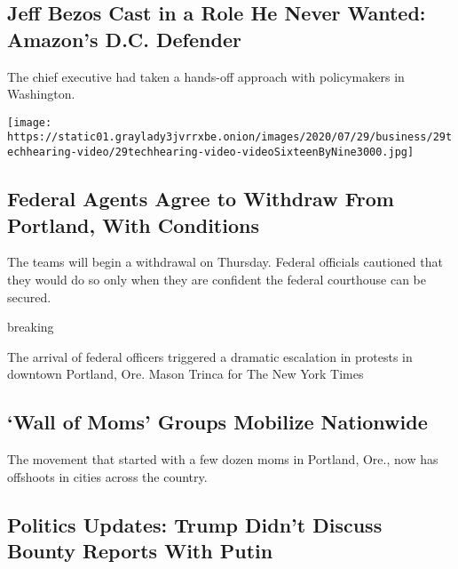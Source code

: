 \hypertarget{jeff-bezos-cast-in-a-role-he-never-wanted-amazons-dc-defender}{%
\subsection{Jeff Bezos Cast in a Role He Never Wanted: Amazon's D.C.
Defender}\label{jeff-bezos-cast-in-a-role-he-never-wanted-amazons-dc-defender}}

The chief executive had taken a hands-off approach with policymakers in
Washington.

\texttt{[image: https://static01.graylady3jvrrxbe.onion/images/2020/07/29/business/29techhearing-video/29techhearing-video-videoSixteenByNine3000.jpg]}

\href{/2020/07/29/us/protests-portland-federal-withdrawal.html}{}

\hypertarget{federal-agents-agree-to-withdraw-from-portland-with-conditions}{%
\subsection{Federal Agents Agree to Withdraw From Portland, With
Conditions}\label{federal-agents-agree-to-withdraw-from-portland-with-conditions}}

The teams will begin a withdrawal on Thursday. Federal officials
cautioned that they would do so only when they are confident the federal
courthouse can be secured.

breaking

\href{/2020/07/29/us/protests-portland-federal-withdrawal.html}{}

The arrival of federal officers triggered a dramatic escalation in
protests in downtown Portland, Ore. Mason Trinca for The New York Times

\href{/2020/07/27/parenting/wall-of-moms-protests.html}{}

\hypertarget{wall-of-moms-groups-mobilize-nationwide}{%
\subsection{`Wall of Moms' Groups Mobilize
Nationwide}\label{wall-of-moms-groups-mobilize-nationwide}}

The movement that started with a few dozen moms in Portland, Ore., now
has offshoots in cities across the country.

\href{/2020/07/29/us/elections/biden-vs-trump.html}{}

\hypertarget{politics-updates-trump-didnt-discuss-bounty-reports-with-putin}{%
\subsection{Politics Updates: Trump Didn't Discuss Bounty Reports With
Putin}\label{politics-updates-trump-didnt-discuss-bounty-reports-with-putin}}

